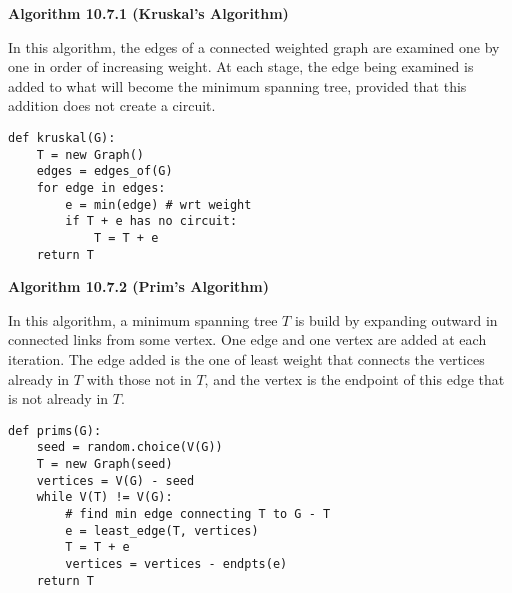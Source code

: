 \documentclass[a4paper]{article}
\newcommand{\subheading}[1]{{\scriptsize\textbf{#1}}}
\begin{document}
\begin{multicols*}{4}
\subheading{Algorithm 10.7.1 (Kruskal's Algorithm)}

In this algorithm, the edges of a connected weighted graph are examined one by
one in order of increasing weight. At each stage, the edge being examined is
added to what will become the minimum spanning tree, provided that this addition
does not create a circuit.
\begin{center}
\begin{BVerbatim}
def kruskal(G):
    T = new Graph()
    edges = edges_of(G)
    for edge in edges:
        e = min(edge) # wrt weight
        if T + e has no circuit:
            T = T + e
    return T
\end{BVerbatim}
\end{center}

\subheading{Algorithm 10.7.2 (Prim's Algorithm)}

In this algorithm, a minimum spanning tree $T$ is build by expanding outward in
connected links from some vertex. One edge and one vertex are added at each
iteration. The edge added is the one of least weight that connects the vertices
already in $T$ with those not in $T$, and the vertex is the endpoint of this
edge that is not already in $T$.
\begin{center}
\begin{BVerbatim}
def prims(G):
    seed = random.choice(V(G))
    T = new Graph(seed)
    vertices = V(G) - seed
    while V(T) != V(G):
        # find min edge connecting T to G - T
        e = least_edge(T, vertices)
        T = T + e
        vertices = vertices - endpts(e)
    return T
\end{BVerbatim}
\end{center}

\end{multicols*}
\end{document}
